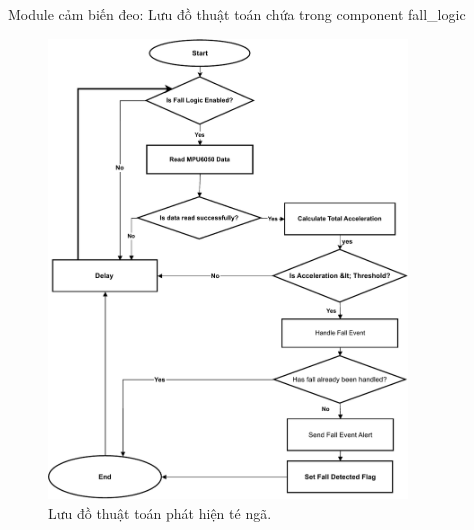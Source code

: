 \begin{frame}[fragile]{Module cảm biến đeo: Lưu đồ thuật toán chứa trong component fall\_logic}
    \begin{figure}
        \centering
        \includegraphics[width=0.85\textwidth,height=0.7\textheight,keepaspectratio]{images/module1_fall_logic_diagram.pdf}
        \caption{Lưu đồ thuật toán phát hiện té ngã.}
        \label{fig:fall_logic_flow}
    \end{figure}
\end{frame}
